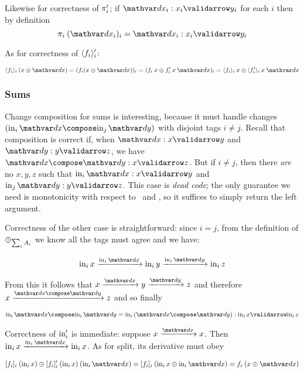 \noindent
Likewise for correctness of $\pi'_i$; if $\valid{\dx_i}{x_i}{y_i}$ for each
$i$ then by definition
\[\valid{\pi_i\<(\dx_i)_i = \dx_i}{x_i}{y_i}\]

\noindent As for correctness of $\langle{f_i}\rangle_i'$:

\nopagebreak[2]
\begin{equation*}
  \fork{f_i}_i \<(x \upd \dx)
  = (f_i(x \upd \dx))_i
  = (f_i\<x \upd \deriv f_i \<x \<\dx)_i
  = \fork{f_i}_i \<x \upd \fork{\deriv f_i}_i \<x \<\dx
\end{equation*}

\subsubsection{Sums}

Change composition for sums is interesting, because it must handle changes
$(\inj i \dx \compose \inj j \dy)$ with disjoint tags $i \ne j$. Recall that
composition is correct if, when $\valid\dx x y$ and $\valid\dy y z$, we have
$\valid{\dx\compose\dy} x z$. But if $i \ne j$, then
%
there \emph{are} no $x,y,z$ such that $\valid{\inj i \dx} x y$ and $\valid{\inj j \dy} y z$.
%
This case is \emph{dead code}; the only guarantee we need is monotonicity with
respect to \dx\ and \dy, so it suffices to simply return the left argument.

Correctness of the other case is straightforward: since $i = j$, from the
definition of ${\mathbin{\oplus}}_{\sum_i A_i}$ we know all the tags must agree and we have:

\nopagebreak[2]
\[ \inj i x \longvalidarrow{\inj i \dx} \inj i y
\longvalidarrow{\inj i \dy} \inj i z \]

\noindent From this it follows that \( {x} \longvalidarrow{\dx} {y}
\longvalidarrow{\dy} {z} \) and therefore $\vld{\dx\compose\dy} x z$ and so
finally

\nopagebreak[2]
\[ \valid{\inj i \dx \compose \inj i \dy = \inj i (\dx \compose \dy)}{\inj i x}{\inj i z} \]

\noindent
Correctness of $\mathrm{in}'_i$ is immediate: suppose $\vld\dx x x$. Then
\(\vld{\inj i \dx}{\inj i x}{\inj i x}\). As for split, its derivative must obey

\nopagebreak[2]
\begin{equation*}
  \krof{f_i}_i\<(\inj i x) \upd \deriv{\krof{f_i}_i} \<(\inj i x) \<(\inj i \dx)
  = \krof{f_i}_i\<(\inj i x \upd \inj i \dx)
  = f_i \<(x \upd \dx)
\end{equation*}

